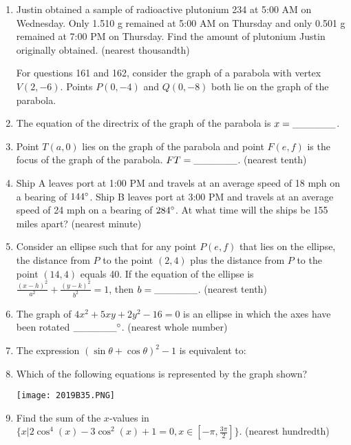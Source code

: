 \documentclass[../uilmath.tex]{subfiles}
\begin{document}
\begin{enumerate}[label=\bfseries\arabic*.]
    \item %
    Justin obtained a sample of radioactive plutonium 234 at 5:00 AM on Wednesday. Only 1.510 g remained at 5:00 AM on Thursday and only 0.501 g remained at 7:00 PM on Thursday. Find the amount of plutonium Justin originally obtained. (nearest thousandth)
    

    For questions 161 and 162, consider the graph of a parabola with vertex $V(2,-6)$. Points $P(0,-4)$ and $Q(0,-8)$ both lie on the graph of the parabola.
    \item %
    The equation of the directrix of the graph of the parabola is $x=\_\_\_\_\_\_$.

    \item %
    Point $T(a,0)$ lies on the graph of the parabola and point $F(e,f)$ is the focus of the graph of the parabola. $FT=\_\_\_\_\_\_$. (nearest tenth)

    \item %
    Ship A leaves port at 1:00 PM and travels at an average speed of 18 mph on a bearing of $144\degree$. Ship B leaves port at 3:00 PM and travels at an average speed of 24 mph on a bearing of $284\degree$. At what time will the ships be 155 miles apart? (nearest minute)
    
    \item %
    Consider an ellipse such that for any point $P(e,f)$ that lies on the ellipse, the distance from $P$ to the point $(2,4)$ plus the distance from $P$ to the point $(14,4)$ equals 40. If the equation of the ellipse is $\frac{(x-h)^2}{a^2}+\frac{(y-k)^2}{b^2}=1$, then $b=\_\_\_\_\_\_$. (nearest tenth)

    \item %
    The graph of $4x^2+5xy+2y^2-16=0$ is an ellipse in which the axes have been rotated $\_\_\_\_\_\_\degree$. (nearest whole number)

    \item %
    The expression $(\sin\theta + \cos\theta)^2-1$ is equivalent to:

    \item %
    Which of the following equations is represented by the graph shown?
    \begin{center}
        \texttt{[image: 2019B35.PNG]}
    \end{center}

    \item %
    Find the sum of the $x$-values in $\{x|2\cos^4(x)-3\cos^2(x)+1=0, x\in [-\pi, \frac{3\pi}{2}]\}$. (nearest hundredth)


\end{enumerate}
\end{document}
